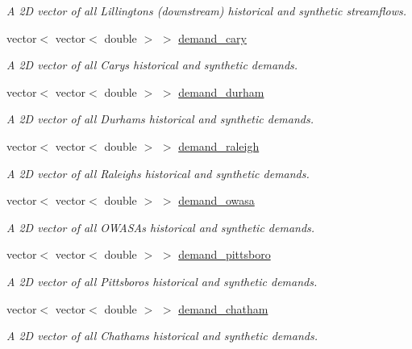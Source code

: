 \begin{DoxyCompactItemize}
\begin{DoxyCompactList}\small\item\em A 2D vector of all Lillington\textquotesingle{}s (downstream) historical and synthetic streamflows. \end{DoxyCompactList}\item 
vector$<$ vector$<$ double $>$ $>$ \mbox{\hyperlink{classTriangle_a64dfcb5c1225f772fdadee71f776bc6a}{demand\+\_\+cary}}
\begin{DoxyCompactList}\small\item\em A 2D vector of all Cary\textquotesingle{}s historical and synthetic demands. \end{DoxyCompactList}\item 
vector$<$ vector$<$ double $>$ $>$ \mbox{\hyperlink{classTriangle_a0e82969571c5cdb51e98fe4b74a89597}{demand\+\_\+durham}}
\begin{DoxyCompactList}\small\item\em A 2D vector of all Durham\textquotesingle{}s historical and synthetic demands. \end{DoxyCompactList}\item 
vector$<$ vector$<$ double $>$ $>$ \mbox{\hyperlink{classTriangle_a94d23326283d34b4000ac9c1ab6e848f}{demand\+\_\+raleigh}}
\begin{DoxyCompactList}\small\item\em A 2D vector of all Raleigh\textquotesingle{}s historical and synthetic demands. \end{DoxyCompactList}\item 
vector$<$ vector$<$ double $>$ $>$ \mbox{\hyperlink{classTriangle_a3a3e2438a3c125a53d08101dc0ba82ac}{demand\+\_\+owasa}}
\begin{DoxyCompactList}\small\item\em A 2D vector of all O\+W\+A\+SA\textquotesingle{}s historical and synthetic demands. \end{DoxyCompactList}\item 
vector$<$ vector$<$ double $>$ $>$ \mbox{\hyperlink{classTriangle_a7d6bd2daccfe871d4c2cc510f5003f30}{demand\+\_\+pittsboro}}
\begin{DoxyCompactList}\small\item\em A 2D vector of all Pittsboro\textquotesingle{}s historical and synthetic demands. \end{DoxyCompactList}\item 
vector$<$ vector$<$ double $>$ $>$ \mbox{\hyperlink{classTriangle_a82d188ad70195a5433e6a77d21697cb8}{demand\+\_\+chatham}}
\begin{DoxyCompactList}\small\item\em A 2D vector of all Chatham\textquotesingle{}s historical and synthetic demands. \end{DoxyCompactList}\item 

\end{DoxyCompactItemize}
